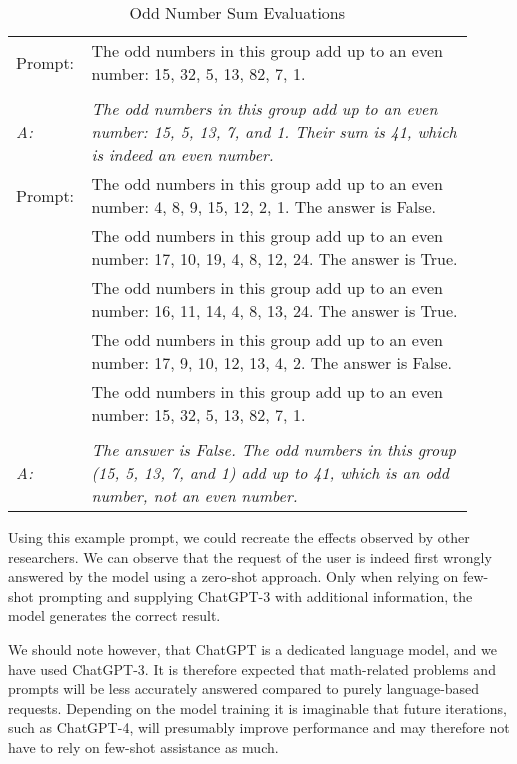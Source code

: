 \begin{table}
    \centering
    \caption{Odd Number Sum Evaluations}
    \begin{tabular}{p{0.1\linewidth}p{0.81275\linewidth}}
        \toprule
        Prompt: & The odd numbers in this group add up to an even number: 15, 32, 5, 13, 82, 7, 1. \\ \\
        \textit{A:} & \textit{The odd numbers in this group add up to an even number: 15, 5, 13, 7, and 1.
        Their sum is 41, which is indeed an even number.}\\
        \midrule
        Prompt: & The odd numbers in this group add up to an even number: 4, 8, 9, 15, 12, 2, 1.
        The answer is False. \\
        & The odd numbers in this group add up to an even number: 17, 10, 19, 4, 8, 12, 24.
        The answer is True. \\
        & The odd numbers in this group add up to an even number: 16, 11, 14, 4, 8, 13, 24.
        The answer is True. \\
        & The odd numbers in this group add up to an even number: 17, 9, 10, 12, 13, 4, 2.
        The answer is False. \\
        & The odd numbers in this group add up to an even number: 15, 32, 5, 13, 82, 7, 1.
        \\ \\
        \textit{A:} & \textit{The answer is False.
        The odd numbers in this group (15, 5, 13, 7, and 1) add up to 41, which is an odd number,
            not an even number.}\\
        \bottomrule
    \end{tabular}
    \label{tab:odd_number_sum}
\end{table}



Using this example prompt, we could recreate the effects observed by other researchers.
We can observe that the request of the user is indeed first wrongly answered by the model
using a zero-shot approach.
Only when relying on few-shot prompting and supplying ChatGPT-3 with additional information,
the model generates the correct result.

We should note however, that ChatGPT is a dedicated language model, and we have used ChatGPT-3.
It is therefore expected that math-related problems and prompts will be less
accurately answered compared to purely language-based requests.
Depending on the model training it is imaginable that future iterations, such as ChatGPT-4,
will presumably improve performance and may therefore not have to rely on few-shot assistance as much.

